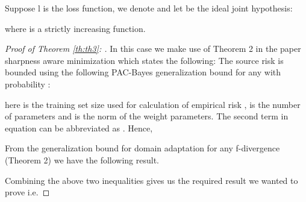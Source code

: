 \documentclass[table,dvipsnames]{article}
\theoremstyle{plain}
\theoremstyle{definition}
\theoremstyle{remark}
\begin{document}
\begin{theorem}
\label{th:th3}
Suppose l is the loss function, we denote  and let  be the ideal joint hypothesis:

where  is a strictly increasing function.
\end{theorem}
\begin{proof}[Proof of Theorem \ref{th:th3}: ]
 In this case we make use of Theorem 2 in the paper sharpness aware minimization \citep{foret2021sharpnessaware} which states the following:
The source risk  is bounded using the following PAC-Bayes generalization bound for any  with probability :

here  is the training set size used for calculation of empirical risk ,  is the number of parameters and  is the norm of the weight parameters. The second term in equation can be abbreviated as . Hence,

From the generalization bound for domain adaptation for any f-divergence  \citep{acuna2021f} (Theorem 2) we have the following result.

Combining the above two inequalities gives us the required result we wanted to prove i.e.


\end{proof}
\end{document}
